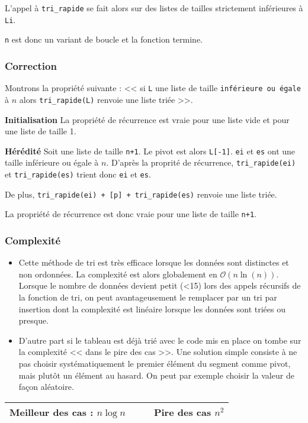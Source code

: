L'appel à \texttt{tri\_rapide} se fait alors sur des listes de tailles strictement inférieures à \texttt{Li}.

\texttt{n} est donc un variant de boucle et la fonction termine. 


\subsubsection{Correction}
Montrons la propriété suivante : << si \texttt{L} une liste de taille \texttt{inférieure ou égale} à $n$ alors  \texttt{tri\_rapide(L)} renvoie une liste triée >>.

\textbf{Initialisation}
La propriété de récurrence est vraie pour une liste vide et pour une liste de taille 1.

\textbf{Hérédité}
Soit une liste de taille \texttt{n+1}. Le pivot est alors \texttt{L[-1]}. \texttt{ei} et \texttt{es} ont une taille inférieure ou égale à $n$. 
D'après la proprité de récurrence, \texttt{tri\_rapide(ei)} et \texttt{tri\_rapide(es)} trient donc \texttt{ei} et \texttt{es}.

De plus, \texttt{tri\_rapide(ei) + [p] + tri\_rapide(es)} renvoie une liste triée. 

La propriété de récurrence est donc vraie pour une liste de taille \texttt{n+1}.

\subsubsection{Complexité}
\begin{prop}
\begin{itemize}
\item Cette méthode de tri est très efficace lorsque les données sont distinctes et non ordonnées. La complexité est alors globalement en $\mathcal{O}(n \ln(n))$. Lorsque le nombre de données devient petit (<15) lors des appels récursifs de la fonction de tri, on peut avantageusement le remplacer par un tri par insertion dont la complexité est linéaire lorsque les données sont triées ou presque. \cite{Beynet}




\item D'autre part si le tableau est déjà trié avec le code mis en place on tombe sur la complexité << dans le pire des cas >>. Une solution simple consiste à ne pas choisir systématiquement
le premier élément du segment comme pivot, mais plutôt un élément au hasard. On peut par exemple choisir la valeur de façon aléatoire. \cite{wack}
\end{itemize}

\begin{center}
\begin{tabular}{llll}
\hline
Meilleur des cas : $n \log n$ &&&  Pire des cas $n^2$  \\ 
\hline 
\end{tabular} 
\end{center}

\end{prop}


